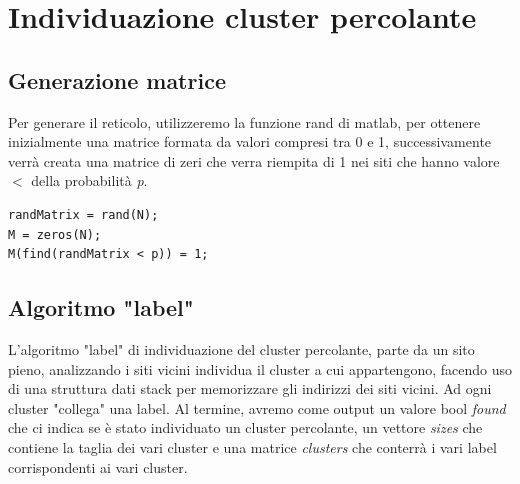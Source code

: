\documentclass[10pt,a4paper]{article}
\begin{document}
\section{Individuazione cluster percolante}
\subsection{Generazione matrice}
Per generare il reticolo, utilizzeremo la funzione rand di matlab, per ottenere inizialmente una matrice formata da valori compresi tra 0 e 1, successivamente verrà creata una matrice di zeri che verra riempita di 1 nei siti che hanno valore $<$ della probabilità \emph{p}. \\

\begin{lstlisting}[caption={cluster\_finding.m},label=useless]
randMatrix = rand(N);
M = zeros(N);
M(find(randMatrix < p)) = 1;
\end{lstlisting}
\subsection{Algoritmo "label"}
L'algoritmo "label" di individuazione del cluster percolante, parte da un sito pieno, analizzando i siti vicini individua il cluster a cui appartengono, facendo uso di una struttura dati stack per memorizzare gli indirizzi dei siti vicini. Ad ogni cluster "collega" una label. Al termine, avremo come output un valore bool \emph{found} che ci indica se è stato individuato un cluster percolante, un vettore \emph{sizes} che contiene la taglia dei vari cluster e una matrice \emph{clusters} che conterrà i vari label corrispondenti ai vari cluster.\\
\end{document}

